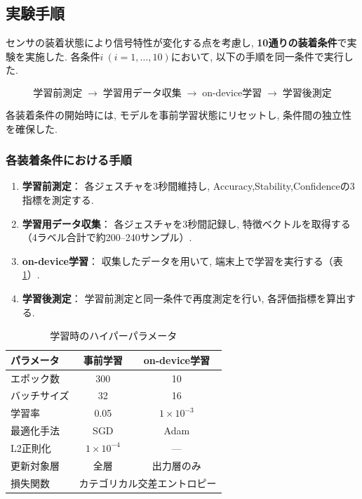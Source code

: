 \subsection{実験手順}
センサの装着状態により信号特性が変化する点を考慮し,
\textbf{10通りの装着条件}で実験を実施した.
各条件$i\ (i=1,\dots,10)$において,
以下の手順を同一条件で実行した.

\begin{equation}
\text{学習前測定}
\;\rightarrow\;
\text{学習用データ収集}
\;\rightarrow\;
\text{on-device学習}
\;\rightarrow\;
\text{学習後測定}
\end{equation}

各装着条件の開始時には,
モデルを事前学習状態にリセットし,
条件間の独立性を確保した.

\subsubsection{各装着条件における手順}
\begin{enumerate}
  \item \textbf{学習前測定}：
  各ジェスチャを3秒間維持し,
  Accuracy,Stability,Confidenceの3指標を測定する.
  
  \item \textbf{学習用データ収集}：
  各ジェスチャを3秒間記録し,
  特徴ベクトルを取得する（4ラベル合計で約200--240サンプル）.
  
  \item \textbf{on-device学習}：
  収集したデータを用いて,
  端末上で学習を実行する（表\ref{tab:hyperparameters}）.
  
  \item \textbf{学習後測定}：
  学習前測定と同一条件で再度測定を行い,
  各評価指標を算出する.
\end{enumerate}

\begin{table}[htbp]
  \centering
  \caption{学習時のハイパーパラメータ}
  \label{tab:hyperparameters}
  \begin{tabular}{lcc}
    \hline
    パラメータ & 事前学習 & on-device学習 \\
    \hline
    エポック数 & 300 & 10 \\
    バッチサイズ & 32 & 16 \\
    学習率 & 0.05 & $1 \times 10^{-3}$ \\
    最適化手法 & SGD & Adam \\
    L2正則化 & $1 \times 10^{-4}$ & --- \\
    更新対象層 & 全層 & 出力層のみ \\
    損失関数 & \multicolumn{2}{c}{カテゴリカル交差エントロピー} \\
    \hline
  \end{tabular}
\end{table}

